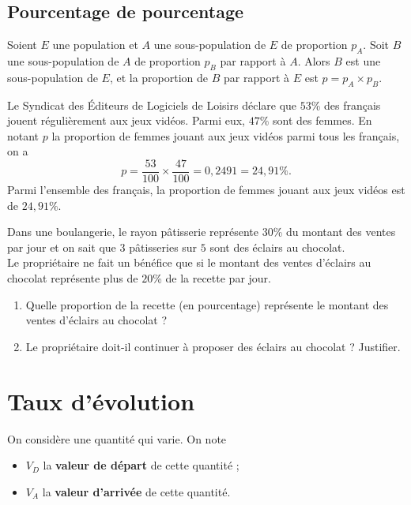 \documentclass[11pt]{article}
\begin{document}
\subsection{Pourcentage de pourcentage}
\begin{prop}
  Soient $E$ une population et $A$ une sous-population de $E$ de proportion
  $p_A$. Soit $B$ une sous-population de $A$ de proportion $p_B$ par rapport à
  $A$. Alors $B$ est une sous-population de $E$, et la proportion de $B$ par
  rapport à $E$ est $p=p_A\times p_B$.
\end{prop}
\begin{exemple}
  Le Syndicat des Éditeurs de Logiciels de Loisirs déclare que $53$\% des
  français jouent régulièrement aux jeux vidéos. Parmi eux, $47$\% sont des
  femmes. En notant $p$ la proportion de femmes jouant aux jeux vidéos parmi
  tous les français, on a
  \[
    p = \frac{53}{100}\times\frac{47}{100} = 0,2491 = 24,91\%.
  \]
  Parmi l'ensemble des français, la proportion de femmes jouant aux jeux vidéos
  est de $24,91\%$.
\end{exemple}
\begin{app}
  Dans une boulangerie, le rayon p\^atisserie représente $30$\% du montant des
  ventes par jour et on sait que $3$ p\^atisseries sur $5$ sont des éclairs au
  chocolat.\\
  Le propriétaire ne fait un bénéfice que si le montant des ventes d'éclairs au
  chocolat représente plus de $20$\% de la recette par jour.
  \begin{enumerate}
    \item Quelle proportion de la recette (en pourcentage) représente le montant
      des ventes d'éclairs au chocolat ?
    \item Le propriétaire doit-il continuer à proposer des éclairs au chocolat ?
      Justifier.
  \end{enumerate}
\end{app}

\section{Taux d'évolution}
\noindent On considère une quantité qui varie. On note
\begin{itemize}
  \item $V_D$ la \textbf{valeur de départ} de cette quantité ;
  \item $V_A$ la \textbf{valeur d'arrivée} de cette quantité.
\end{itemize}
\end{document}
